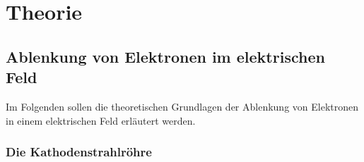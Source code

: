 \section{Theorie} 
\label{sec:theorie}

\subsection{Ablenkung von Elektronen im elektrischen Feld}
\label{sec:ablenkung_efeld}

    Im Folgenden sollen die theoretischen Grundlagen der Ablenkung von Elektronen in einem elektrischen Feld erläutert werden.

\subsubsection{Die Kathodenstrahlröhre}
\label{sec:kathodenstrahlröhre}

